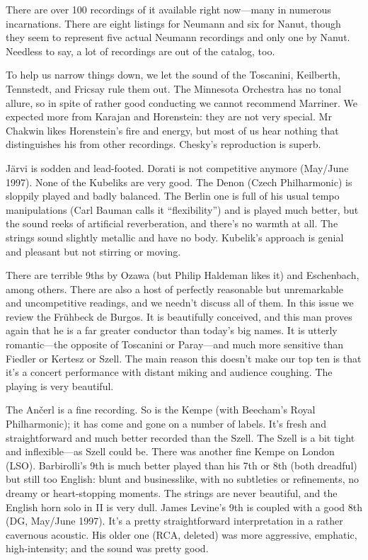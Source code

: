 \documentclass[12pt]{article}%
\begin{document}
There are over 100 recordings of it available right now---many in numerous incarnations.
There are eight listings for Neumann and six for Nanut, though they seem to represent
five actual Neumann recordings and only one by Nanut. 
Needless to say, a lot of recordings are out of the catalog, too.

To help us narrow things down, we let the sound of the Toscanini, Keilberth,
Tennstedt, and Fricsay rule them out. The Minnesota Orchestra has no tonal allure,
so in spite of rather good conducting we cannot recommend Marriner.
We expected more from Karajan and Horenstein: they are not very special.
Mr Chakwin likes Horenstein's fire and energy,
but most of us hear nothing that distinguishes his from other recordings. Chesky's reproduction is superb.

Järvi is sodden and lead-footed. Dorati is not competitive anymore (May/June 1997).
None of the Kubeliks are very good. The Denon (Czech Philharmonic) is sloppily played and badly balanced. The Berlin one is full of his usual tempo manipulations (Carl Bauman calls it ``flexibility'') and is played much better, but the sound reeks of artificial reverberation, and there's no warmth at all.
The strings sound slightly metallic and have no body. Kubelik's approach is genial and pleasant but not stirring or moving.

There are terrible 9ths by Ozawa (but Philip Haldeman likes it) and Eschenbach, among others. There are also a host of perfectly reasonable but unremarkable and uncompetitive readings, and we needn't discuss all of them. In this issue we review the Frühbeck de Burgos. It is beautifully conceived, and this man proves again that he is a far greater conductor than today's big names. It is utterly romantic---the opposite of Toscanini or Paray---and much more sensitive than Fiedler
or Kertesz or Szell. The main reason this doesn't make our top ten is that it's a concert performance with distant miking and audience coughing. The playing is very beautiful.

The Ančerl is a fine recording. 
So is the Kempe (with Beecham's Royal Philharmonic); it has come and gone on a number of labels.
It's fresh and straightforward and much better recorded than the Szell. The Szell is a bit tight and inflexible---as Szell could be. There was another fine Kempe on London (LSO). Barbirolli's 9th is much better played than his 7th or 8th (both dreadful) but still too English: blunt and businesslike, with no subtleties or refinements, no dreamy or heart-stopping moments. The strings are never beautiful, and the English horn solo in II is very dull.
James Levine's 9th is coupled with a good 8th (DG, May/June 1997). It's a pretty straightforward interpretation in a rather cavernous acoustic. His older one (RCA, deleted) was more aggressive, emphatic, high-intensity; and the sound was pretty good.
\end{document}

